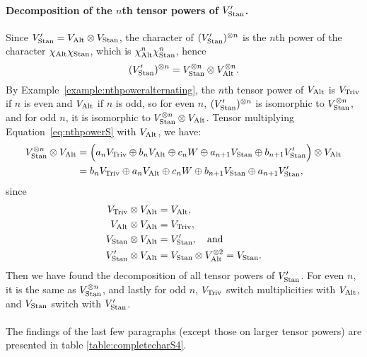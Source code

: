{\begin{example}
	\paragraph{Decomposition of the $n$th tensor powers of $V'_{\text{Stan}}$.} Since $V'_{\text{Stan}} = V_{\text{Alt}} \otimes V_{\text{Stan}}$, the character of $(V'_{\text{Stan}})^{\otimes n}$ is the $n$th power of the character $\chi_{\text{Alt}} \chi_{\text{Stan}}$, which is $\chi_{\text{Alt}}^n\chi_{\text{Stan}}^n$, hence%
	\begin{align*}
		(V'_{\text{Stan}})^{\otimes n} = V_{\text{Stan}}^{\otimes n} \otimes V_{\text{Alt}}^{\otimes n}.
	\end{align*}
	By Example~\ref{example:nthpoweralternating}, the $n$th tensor power of $V_{\text{Alt}}$ is $V_{\text{Triv}}$ if $n$ is even and $V_{\text{Alt}}$ if $n$ is odd, so for even $n$, $(V'_{\text{Stan}})^{\otimes n}$ is isomorphic to $V_{\text{Stan}}^{\otimes n}$, and for odd $n$, it is isomorphic to $ V_{\text{Stan}}^{\otimes n} \otimes V_{\text{Alt}}$. Tensor multiplying Equation~\ref{eq:nthpowerS} with $V_{\text{Alt}}$, we have:
	\begin{align*}
		V_{\text{Stan}}^{\otimes n} \otimes V_{\text{Alt}} &= \Big(a_n V_{\text{Triv}} \oplus b_n V_{\text{Alt}} \oplus c_n W \oplus a_{n+1} V_{\text{Stan}} \oplus b_{n+1} V'_{\text{Stan}}\Big)\otimes V_{\text{Alt}} \\
		&= b_n V_{\text{Triv}} \oplus a_n V_{\text{Alt}} \oplus c_n W \oplus b_{n+1} V_{\text{Stan}} \oplus a_{n+1} V'_{\text{Stan}},
	\end{align*}
	since 
	\begin{align*}
		V_{\text{Triv}} \otimes V_{\text{Alt}} &= V_{\text{Alt}}, \\
		V_{\text{Alt}} \otimes V_{\text{Alt}} &= V_{\text{Triv}}, \\
		V_{\text{Stan}} \otimes V_{\text{Alt}} &= V'_{\text{Stan}}, \quad \text{and} \\
		V'_{\text{Stan}} \otimes V_{\text{Alt}} &= V_{\text{Stan}} \otimes V_{\text{Alt}}^{\otimes 2} = V_{\text{Stan}}.
	\end{align*}
	Then we have found the decomposition of all tensor powers of $V'_{\text{Stan}}$. For even $n$, it is the same as $V_{\text{Stan}}^{\otimes n}$, and lastly for odd $n$, $V_{\text{Triv}}$ switch multiplicities with $V_{\text{Alt}}$, and $V_{\text{Stan}}$ switch with $V'_{\text{Stan}}$.
	
	\paragraph{} The findings of the last few paragraphs (except those on larger tensor powers) are presented in table \ref{table:completecharS4}.
	 \vspace{2cm}
	

\end{example}}
